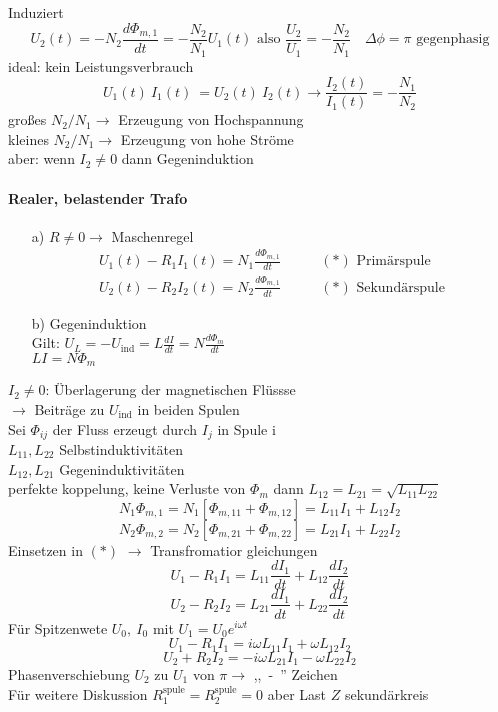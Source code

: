 \documentclass[titlepage,12pt,a4paper,ngerman]{report}
\newcommand{\tx}[1]{\textrm{#1}}
\newcommand{\uind}{U_{\tx{ind}}}
\begin{document}
Induziert $$U_2(t) = - N_2 \frac{d\Phi_{m,1}}{dt} = - \frac{N_2}{N_1} U_1(t) \tx{ also } \frac{U_2}{U_1} = -\frac{N_2}{N_1}\quad \Delta\phi = \pi \tx{ gegenphasig}$$
ideal: kein Leistungsverbrauch
$$U_1(t)\ I_1(t)\ = U_2 (t)\ I_2(t) \rightarrow \frac{I_2 (t)}{I_1 (t) } = -\frac{N_1}{N_2}$$
großes $N_2/N_1 \rightarrow$ Erzeugung von Hochspannung\\
kleines $N_2/N_1 \rightarrow$ Erzeugung von hohe Ströme\\
aber: wenn $I_2 \neq 0$ dann Gegeninduktion
\paragraph{Realer, belastender Trafo}
\begin{enumerate}
	\item[a)] $R\neq 0 \rightarrow $ Maschenregel
	\begin{align*}
 	U_1 (t) - R_1I_1(t) = N_1 \frac{d\Phi_{m,1}}{dt} \qquad &(*) \tx{ Primärspule}\\
	U_2 (t) - R_2I_2(t) = N_2 \frac{d\Phi_{m,1}}{dt}  \qquad &(*) \tx{ Sekundärspule}
	\end{align*}
	\item[b)] Gegeninduktion\\
	Gilt: $U_L = - \uind = L\frac{dI}{dt}= N \frac{d\Phi_m}{dt}$\\
	$LI = N\Phi_m$
	\end{enumerate}
$ I_2 \neq 0 $: Überlagerung der magnetischen Flüssse\\
$ \rightarrow $ Beiträge zu $ \uind $ in beiden Spulen\\
Sei $ \Phi_{ij} $ der Fluss erzeugt durch $ I_j $ in Spule i \\
$ L_{11},L_{22} $ Selbstinduktivitäten\\
$ L_{12},L_{21} $ Gegeninduktivitäten \\
perfekte koppelung, keine Verluste von $\Phi_m$ dann $L_{12} = L_{21} = \sqrt{L_{11}L_{22}}$
$$N_1 \Phi_{m,1} = N_1[\Phi_{m,11} + \Phi_{m,12}] = L_{11} I_1 + L_{12}I_2$$
$$N_2 \Phi_{m,2} = N_2[\Phi_{m,21} + \Phi_{m,22}] = L_{21} I_1 + L_{22}I_2$$
Einsetzen in $(*)$ $\rightarrow$ Transfromatior gleichungen
$$U_1 - R_1 I_1 = L_{11} \frac{dI_1}{dt}+ L_{12} \frac{dI_2}{dt}$$
$$U_2 - R_2 I_2 = L_{21} \frac{dI_1}{dt}+ L_{22} \frac{dI_2}{dt}$$
Für Spitzenwete $U_0,\ I_0$ mit $U_1 = U_0 e^{i\omega t}$
$$U_1 - R_1 I_1 = i\omega L_{11} I_1 + \omega L_{12} I_2$$
$$U_2 + R_2 I_2 = - i\omega L_{21} I_1 - \omega L_{22} I_2$$
Phasenverschiebung $U_2$ zu $U_1$ von $\pi \rightarrow$ ,,\ -\ '' Zeichen\\
Für weitere Diskussion $R^{\tx{spule}}_1 = R^{\tx{spule}}_2 = 0$ aber Last $Z$ sekundärkreis
\end{document}
